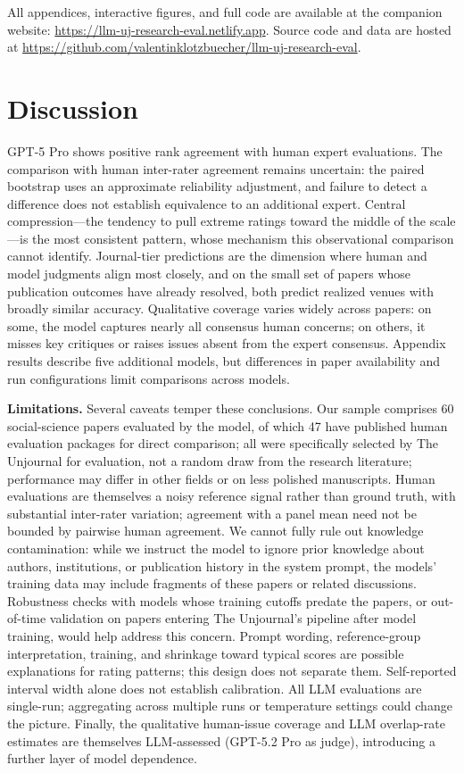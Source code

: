 \documentclass[
  11pt,
  letterpaper,
]{article}
\begin{document}
All appendices, interactive figures, and full code are available at the
companion website: \url{https://llm-uj-research-eval.netlify.app}.
Source code and data are hosted at
\url{https://github.com/valentinklotzbuecher/llm-uj-research-eval}.


\section{Discussion}\label{discussion}

GPT-5 Pro shows positive rank agreement with human expert evaluations.
The comparison with human inter-rater agreement remains uncertain: the
paired bootstrap uses an approximate reliability adjustment, and failure
to detect a difference does not establish equivalence to an additional
expert. Central compression---the tendency to pull extreme ratings
toward the middle of the scale---is the most consistent pattern, whose
mechanism this observational comparison cannot identify. Journal-tier
predictions are the dimension where human and model judgments align most
closely, and on the small set of papers whose publication outcomes have
already resolved, both predict realized venues with broadly similar
accuracy. Qualitative coverage varies widely across papers: on some, the
model captures nearly all consensus human concerns; on others, it misses
key critiques or raises issues absent from the expert consensus.
Appendix results describe five additional models, but differences in
paper availability and run configurations limit comparisons across
models.

\textbf{Limitations.} Several caveats temper these conclusions. Our
sample comprises 60 social-science papers evaluated by the model, of
which 47 have published human evaluation packages for direct comparison;
all were specifically selected by The Unjournal for evaluation, not a
random draw from the research literature; performance may differ in
other fields or on less polished manuscripts. Human evaluations are
themselves a noisy reference signal rather than ground truth, with
substantial inter-rater variation; agreement with a panel mean need not
be bounded by pairwise human agreement. We cannot fully rule out
knowledge contamination: while we instruct the model to ignore prior
knowledge about authors, institutions, or publication history in the
system prompt, the models' training data may include fragments of these
papers or related discussions. Robustness checks with models whose
training cutoffs predate the papers, or out-of-time validation on papers
entering The Unjournal's pipeline after model training, would help
address this concern. Prompt wording, reference-group interpretation,
training, and shrinkage toward typical scores are possible explanations
for rating patterns; this design does not separate them. Self-reported
interval width alone does not establish calibration. All LLM evaluations
are single-run; aggregating across multiple runs or temperature settings
could change the picture. Finally, the qualitative human-issue coverage
and LLM overlap-rate estimates are themselves LLM-assessed (GPT-5.2 Pro
as judge), introducing a further layer of model dependence.
\end{document}
